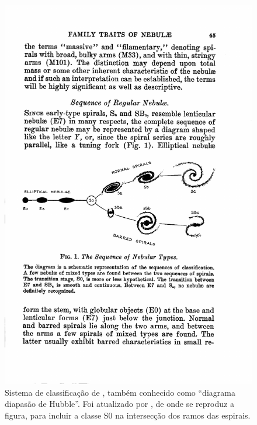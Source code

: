 \begin{figure}
	\includegraphics[width=1.0\textwidth]{figuras/HubbleSequence}
	\caption[Classificação de Hubble]
	{Sistema de classificação de \citet{hubble1936}, também conhecido como
	``diagrama diapasão de Hubble''. Foi atualizado por
	\citet{Sandage1975}, de onde se reproduz a figura, para incluir a classe S0 na
	intersecção dos ramos das espirais.}
	\label{fig:HubbleSequence}
\end{figure}

